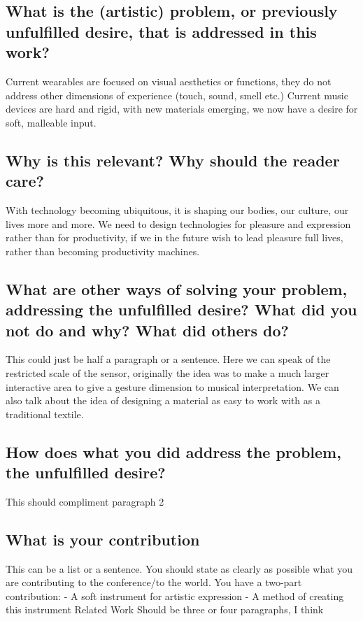 \documentclass{sigchi-ext}
\begin{document}
\subsection{What is the (artistic) problem, or previously unfulfilled desire, that is addressed in this work?}
Current wearables are focused on visual aesthetics or functions, they do not address other dimensions of experience (touch, sound, smell etc.)
Current music devices are hard and rigid, with new materials emerging, we now have a desire for soft, malleable input.


\subsection{Why is this relevant? Why should the reader care?}
With technology becoming ubiquitous, it is shaping our bodies, our culture, our lives more and more. We need to design technologies for pleasure and expression rather than for productivity, if we in the future wish to lead pleasure full lives, rather than becoming productivity machines.


\subsection{What are other ways of solving your problem, addressing the unfulfilled desire? What did you not do and why? What did others do?}

This could just be half a paragraph or a sentence.
Here we can speak of the restricted scale of the sensor, originally the idea was to make a much larger interactive area to give a gesture dimension to musical interpretation.
We can also talk about the idea of designing a material as easy to work with as a traditional textile.


\subsection{How does what you did address the problem, the unfulfilled desire?}
This should compliment paragraph 2


\subsection{What is your contribution}
This can be a list or a sentence. You should state as clearly as possible what you are contributing to the conference/to the world. You have a two-part contribution:
- A soft instrument for artistic expression
- A method of creating this instrument
Related Work
Should be three or four paragraphs, I think
\end{document}
